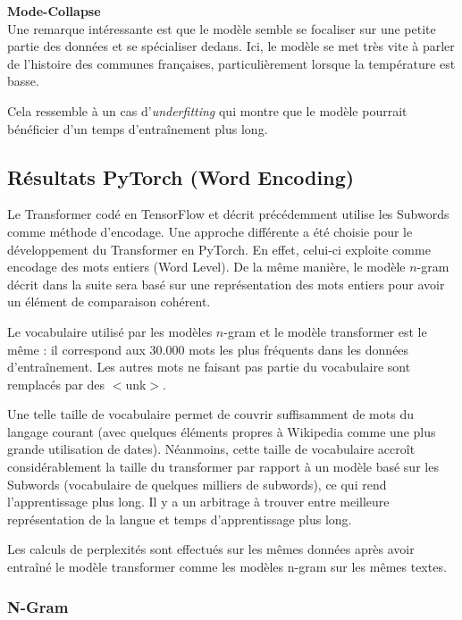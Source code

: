\textbf{Mode-Collapse} \\

Une remarque intéressante est que le modèle semble se focaliser sur une petite partie des données et se spécialiser dedans.
Ici, le modèle se met très vite à parler de
l'histoire des communes françaises, particulièrement lorsque la
température est basse.

Cela ressemble à un cas d'\textit{underfitting} qui montre que le modèle pourrait
bénéficier d'un temps d'entraînement plus long.

\newpage

\subsection{Résultats PyTorch (Word Encoding)}

Le Transformer codé en TensorFlow et décrit précédemment utilise les Subwords
comme méthode d’encodage. Une approche différente a été choisie pour le
développement du Transformer en PyTorch. En effet, celui-ci exploite comme
encodage des mots entiers (Word Level). De la même manière, le modèle $n$-gram
décrit dans la suite sera basé sur une représentation des mots entiers
pour avoir un élément de comparaison cohérent.

Le vocabulaire utilisé par les modèles $n$-gram et le modèle transformer
est le même : il correspond aux 30.000 mots les plus fréquents
dans les données d'entraînement. Les autres mots ne faisant pas partie du vocabulaire sont remplacés par des $<$unk$>$.

Une telle taille de vocabulaire permet de couvrir suffisamment de mots du langage
courant (avec quelques éléments propres à Wikipedia comme une plus grande utilisation de dates).
Néanmoins, cette taille de vocabulaire accroît considérablement la taille du transformer
par rapport à un modèle basé sur les Subwords (vocabulaire de quelques milliers de subwords), ce qui rend l’apprentissage plus long. Il y a un arbitrage à trouver entre meilleure représentation de la langue et temps d’apprentissage plus long.

Les calculs de perplexités sont effectués sur les mêmes données après avoir entraîné le modèle transformer comme les modèles n-gram sur les mêmes textes.

\subsubsection{N-Gram}

